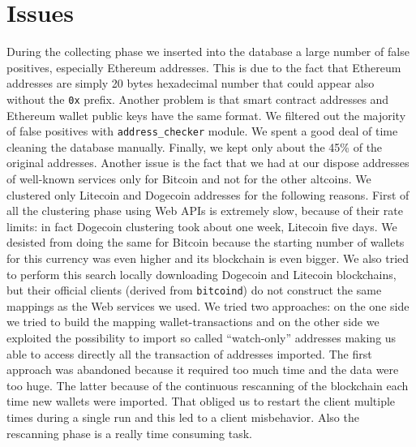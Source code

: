 \section{Issues} \label{sec:issues}
During the collecting phase we inserted into the database a large number of
false positives, especially Ethereum addresses. This is due to the fact that
Ethereum addresses are simply 20 bytes hexadecimal number that could appear
also without the \texttt{0x} prefix. Another problem is that smart contract
addresses and Ethereum wallet public keys have the same format. We filtered out
the majority of false positives with \texttt{address\_checker} module. We spent
a good deal of time cleaning the database manually. Finally, we kept only about
the 45\% of the original addresses. 
Another issue is the fact that we had at our dispose addresses
of well-known services only for Bitcoin and not for the other altcoins.
We clustered only Litecoin and Dogecoin addresses for the following reasons.
First of all the clustering phase using Web APIs is extremely slow, because of
their rate limits: in fact Dogecoin clustering took about one week, Litecoin
five days.
We desisted from doing the same for Bitcoin because the starting number of
wallets for this currency was even higher and its blockchain is even bigger. We
also tried to perform this search locally downloading Dogecoin and Litecoin
blockchains, but their official clients (derived from \texttt{bitcoind}) do not
construct the same mappings as the Web services we used. We tried two
approaches: on the one side we tried to build the mapping wallet-transactions
and on the other side we exploited the possibility to import so called
``watch-only'' addresses making us able to access directly all the transaction
of addresses imported. The first approach was abandoned because it
required too much time and the data were too huge. The latter because of the
continuous rescanning of the blockchain each time new wallets were imported.
That obliged us to restart the client multiple times during a single run and
this led to a client misbehavior. Also the rescanning phase is a really
time consuming task.
